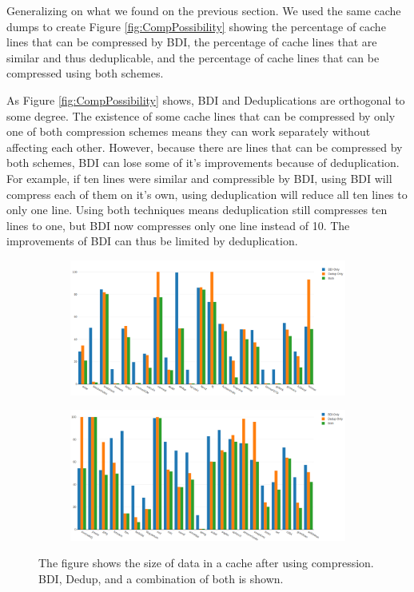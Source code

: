 Generalizing on what we found on the previous section. We used the same cache dumps to create Figure \ref{fig:CompPossibility} showing the percentage of cache lines that can be compressed by BDI, the percentage of cache lines that are similar and thus deduplicable, and the percentage of cache lines that can be compressed using both schemes.\par
As Figure \ref{fig:CompPossibility} shows, BDI and Deduplications are orthogonal to some degree. The existence of some cache lines that can be compressed by only one of both compression schemes means they can work separately without affecting each other. However, because there are lines that can be compressed by both schemes, BDI can lose some of it's improvements because of deduplication. For example, if ten lines were similar and compressible by BDI, using BDI will compress each of them on it's own, using deduplication will reduce all ten lines to only one line. Using both techniques means deduplication still compresses ten lines to one, but BDI now compresses only one line instead of 10. The improvements of BDI can thus be limited by deduplication.\par
\begin{figure}
    \begin{subfigure}[t]{\textwidth}
        \includegraphics[width=\textwidth]{CompSize1.png}
    \end{subfigure}
    \begin{subfigure}[b]{\textwidth}
        \includegraphics[width=\textwidth]{CompSize2.png}
    \end{subfigure}
    \caption[Size after compression]{The figure shows the size of data in a cache after using compression. BDI, Dedup, and a combination of both is shown.}
    \label{fig:CompSize}
\end{figure}

